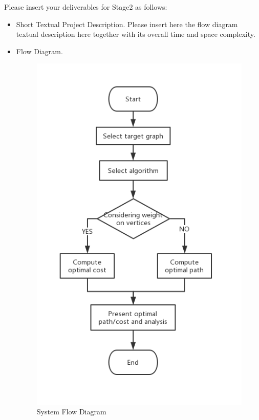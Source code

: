 Please insert your deliverables for Stage2 as follows:
\begin{itemize} 
\item{  Short Textual Project Description. }
Please insert here the flow diagram textual description here together with its overall time and space complexity.
\item{ Flow Diagram. }
\begin{figure}[h]
\includegraphics[width=\linewidth]{Systemflowchart.png}
\caption{System Flow Diagram}
\label{fig1}
\end{figure}

\end{itemize}
